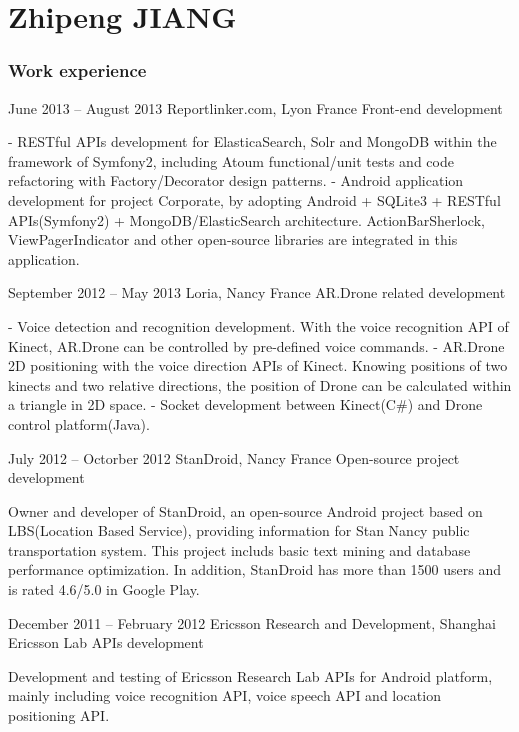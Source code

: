\documentclass{tccv}
\begin{document}
\part{Zhipeng JIANG}

\section{Work experience}

\begin{eventlist}

\item{June 2013 -- August 2013}
     {Reportlinker.com, Lyon France}
     {Front-end development}

- RESTful APIs development for ElasticaSearch, Solr and MongoDB within the framework of Symfony2, including Atoum functional/unit tests and code refactoring with Factory/Decorator design patterns.
\newline
- Android application development for project Corporate, by adopting Android + SQLite3 + RESTful APIs(Symfony2) + MongoDB/ElasticSearch architecture. ActionBarSherlock, ViewPagerIndicator and other open-source libraries are integrated in this application.

\item{September 2012 -- May 2013}
     {Loria, Nancy France}
     {AR.Drone related development}

- Voice detection and recognition development. With the voice recognition API of Kinect, AR.Drone can be controlled by pre-defined voice commands.
\newline
- AR.Drone 2D positioning with the voice direction APIs of Kinect. Knowing positions of two kinects and two relative directions, the position of Drone can be calculated within a triangle in 2D space.
\newline
- Socket development between Kinect(C\#) and Drone control platform(Java).

\item{July 2012 -- Octorber 2012}
     {StanDroid, Nancy France}
     {Open-source project development}

Owner and developer of StanDroid, an open-source Android project based on LBS(Location Based Service), providing information for Stan Nancy public transportation system. This project includs basic text mining and database performance optimization. In addition, StanDroid has more than 1500 users and is rated 4.6/5.0 in Google Play.

\item{December 2011 -- February 2012}
     {Ericsson Research and Development, Shanghai}
     {Ericsson Lab APIs development}

Development and testing of Ericsson Research Lab APIs for Android platform, mainly including voice recognition API, voice speech API and location positioning API.

\end{eventlist}
\end{document}
